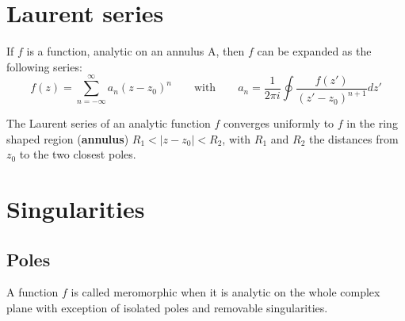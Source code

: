 \section{Laurent series}
    	
    	\begin{definition}\label{complexcalculus:laurent_series}
        	If $f$ is a function, analytic on an annulus A, then $f$ can be expanded as the following series:
        	\begin{equation}
        	        f(z) = \sum^{\infty}_{n=-\infty} a_n (z - z_0)^n \qquad \text{with} \qquad a_n = \frac{1}{2\pi i} \oint \frac{f(z')}{(z' - z_0)^{n+1}} dz'
		\end{equation}
	\end{definition}
        
        \begin{remark}
		The Laurent series of an analytic function $f$ converges uniformly to $f$ in the ring shaped region (\textbf{annulus}) $R_1 < |z - z_0| < R_2$, with $R_1$ and $R_2$ the distances from $z_0$ to the two closest poles.
        \end{remark}
        
    
\section{Singularities}
\subsection{Poles}
	
	
	\begin{definition}[Meromorphic]
		A function $f$ is called meromorphic when it is analytic on the whole complex plane with exception of isolated poles and removable singularities.
	\end{definition}
    
